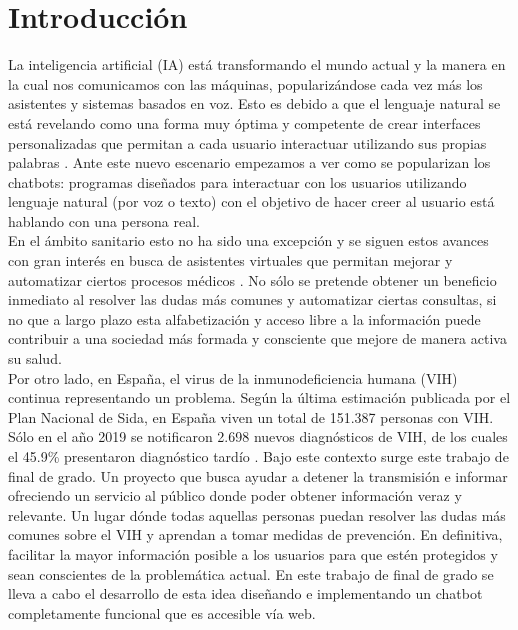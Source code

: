 \section{Introducción}
La inteligencia artificial (IA) está transformando el mundo actual y la manera en la cual nos comunicamos con las máquinas, popularizándose cada vez más los asistentes y sistemas basados en voz. Esto es debido a que el lenguaje natural se está revelando como una forma muy óptima y competente de crear interfaces personalizadas que permitan a cada usuario interactuar utilizando sus propias palabras \cite{naturalDialogue} . Ante este nuevo escenario empezamos a ver como se popularizan los chatbots: programas diseñados para interactuar con los usuarios utilizando lenguaje natural (por voz o texto) con el objetivo de hacer creer al usuario está hablando con una persona real. \\

En el ámbito sanitario esto no ha sido una excepción y se siguen estos avances con gran interés en busca de asistentes virtuales que permitan mejorar y automatizar ciertos procesos médicos \cite{healthAgents}. No sólo se pretende obtener un beneficio inmediato al resolver las dudas más comunes y automatizar ciertas consultas, si no que a largo plazo esta alfabetización y acceso libre a la información puede contribuir a una sociedad más formada y consciente que mejore de manera activa su salud.\\ 

Por otro lado, en España, el virus de la inmunodeficiencia humana (VIH) continua representando un problema. Según la última estimación publicada por el Plan Nacional de Sida, en España viven un total de 151.387 personas con VIH. Sólo en el año 2019 se notificaron 2.698 nuevos diagnósticos de VIH, de los cuales el 45.9\% presentaron diagnóstico tardío \cite{vihEspana}. Bajo este contexto surge este trabajo de final de grado. Un proyecto que busca ayudar a detener la transmisión e informar ofreciendo un servicio al público donde poder obtener información veraz y relevante. Un lugar dónde todas aquellas personas puedan resolver las dudas más comunes sobre el VIH y aprendan a tomar medidas de prevención. En definitiva, facilitar la mayor información posible a los usuarios para que estén protegidos y sean conscientes de la problemática actual. En este trabajo de final de grado se lleva a cabo el desarrollo de esta idea diseñando e implementando un chatbot completamente funcional que es accesible vía web.\\

